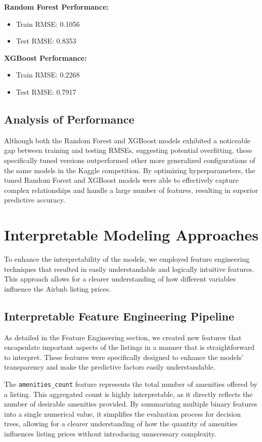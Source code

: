 \documentclass[12pt]{article}
\begin{document}
\noindent \textbf{Random Forest Performance:}
\begin{itemize}
    \item Train RMSE: 0.1056
    \item Test RMSE: 0.8353
\end{itemize}

\noindent \textbf{XGBoost Performance:}
\begin{itemize}
    \item Train RMSE: 0.2268
    \item Test RMSE: 0.7917
\end{itemize}

\subsection{Analysis of Performance}

Although both the Random Forest and XGBoost models exhibited a noticeable gap between training and testing RMSEs, suggesting potential overfitting, these specifically tuned versions outperformed other more generalized configurations of the same models in the Kaggle competition. By optimizing hyperparameters, the tuned Random Forest and XGBoost models were able to effectively capture complex relationships and handle a large number of features, resulting in superior predictive accuracy.

\section{Interpretable Modeling Approaches}

To enhance the interpretability of the models, we employed feature engineering techniques that resulted in easily understandable and logically intuitive features. This approach allows for a clearer understanding of how different variables influence the Airbnb listing prices.

\subsection{Interpretable Feature Engineering Pipeline}

As detailed in the Feature Engineering section, we created new features that encapsulate important aspects of the listings in a manner that is straightforward to interpret. These features were specifically designed to enhance the models' transparency and make the predictive factors easily understandable.

The \texttt{amenities\_count} feature represents the total number of amenities offered by a listing. This aggregated count is highly interpretable, as it directly reflects the number of desirable amenities provided. By summarizing multiple binary features into a single numerical value, it simplifies the evaluation process for decision trees, allowing for a clearer understanding of how the quantity of amenities influences listing prices without introducing unnecessary complexity.
\end{document}
